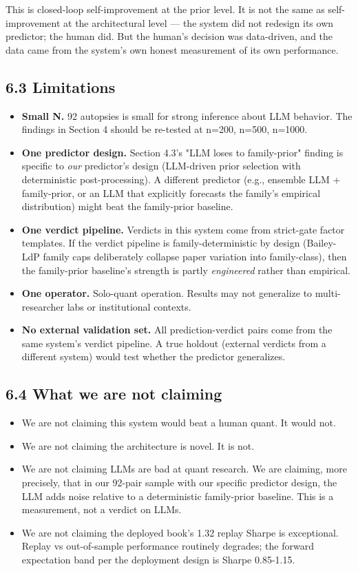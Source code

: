 \documentclass[11pt,a4paper]{article}
\begin{document}
This is closed-loop self-improvement at the prior level. It is not the same as self-improvement at the architectural level — the system did not redesign its own predictor; the human did. But the human's decision was data-driven, and the data came from the system's own honest measurement of its own performance.

\subsection{6.3 Limitations}

\begin{itemize}[leftmargin=*]
\item \textbf{Small N.} 92 autopsies is small for strong inference about LLM behavior. The findings in Section 4 should be re-tested at n=200, n=500, n=1000.
\item \textbf{One predictor design.} Section 4.3's "LLM loses to family-prior" finding is specific to \textit{our} predictor's design (LLM-driven prior selection with deterministic post-processing). A different predictor (e.g., ensemble LLM + family-prior, or an LLM that explicitly forecasts the family's empirical distribution) might beat the family-prior baseline.
\item \textbf{One verdict pipeline.} Verdicts in this system come from strict-gate factor templates. If the verdict pipeline is family-deterministic by design (Bailey-LdP family caps deliberately collapse paper variation into family-class), then the family-prior baseline's strength is partly \textit{engineered} rather than empirical.
\item \textbf{One operator.} Solo-quant operation. Results may not generalize to multi-researcher labs or institutional contexts.
\item \textbf{No external validation set.} All prediction-verdict pairs come from the same system's verdict pipeline. A true holdout (external verdicts from a different system) would test whether the predictor generalizes.
\end{itemize}

\subsection{6.4 What we are not claiming}

\begin{itemize}[leftmargin=*]
\item We are not claiming this system would beat a human quant. It would not.
\item We are not claiming the architecture is novel. It is not.
\item We are not claiming LLMs are bad at quant research. We are claiming, more precisely, that in our 92-pair sample with our specific predictor design, the LLM adds noise relative to a deterministic family-prior baseline. This is a measurement, not a verdict on LLMs.
\item We are not claiming the deployed book's 1.32 replay Sharpe is exceptional. Replay vs out-of-sample performance routinely degrades; the forward expectation band per the deployment design is Sharpe 0.85-1.15.
\end{itemize}
\end{document}
